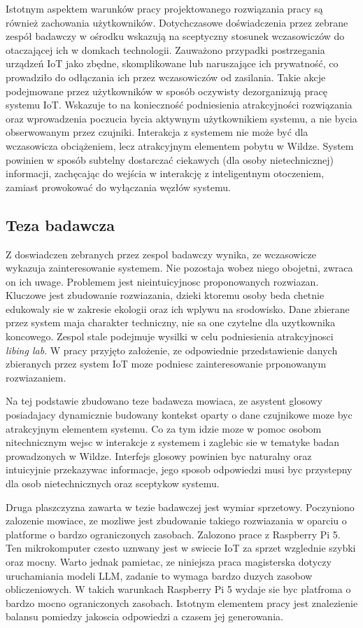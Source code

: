 Istotnym aspektem warunków pracy projektowanego rozwiązania pracy są również zachowania użytkowników. Dotychczasowe doświadczenia przez zebrane zespół badawczy w ośrodku wskazują na sceptyczny stosunek wczasowiczów do otaczającej ich w domkach technologii. Zauważono przypadki postrzegania urządzeń IoT jako zbędne, skomplikowane lub naruszające ich prywatność, co prowadziło do odłączania ich przez wczasowiczów od zasilania. Takie akcje podejmowane przez użytkowników w sposób oczywisty dezorganizują pracę systemu IoT. Wskazuje to na konieczność podniesienia atrakcyjności rozwiązania oraz wprowadzenia poczucia bycia aktywnym użytkownikiem systemu, a nie bycia obserwowanym przez czujniki. Interakcja z systemem nie może być dla wczasowicza obciążeniem, lecz atrakcyjnym elementem pobytu w Wildze. System powinien w sposób subtelny dostarczać ciekawych (dla osoby nietechnicznej) informacji, zachęcając do wejścia w interakcję z inteligentnym otoczeniem, zamiast prowokować do wyłączania węzłów systemu.

\subsection{Teza badawcza}

Z doswiadczen zebranych przez zespol badawczy wynika, ze wczasowicze wykazuja zainteresowanie systemem. Nie pozostaja wobez niego obojetni, zwraca on ich uwage. Problemem jest nieintuicyjnosc proponowanych rozwiazan. Kluczowe jest zbudowanie rozwiazania, dzieki ktoremu osoby beda chetnie edukowaly sie w zakresie ekologii oraz ich wplywu na srodowisko. Dane zbierane przez system maja charakter techniczny, nie sa one czytelne dla uzytkownika koncowego. Zespol stale podejmuje wysilki w celu podniesienia atrakcyjnosci \textit{libing lab}. W pracy przyjęto założenie, ze odpowiednie przedstawienie danych zbieranych przez system IoT moze podniesc zainteresowanie prponowanym rozwiazaniem.


Na tej podstawie zbudowano teze badawcza mowiaca, ze asystent glosowy posiadajacy dynamicznie budowany kontekst oparty o dane czujnikowe moze byc atrakcyjnym elementem systemu. Co za tym idzie moze w pomoc osobom nitechnicznym wejsc w interakcje z systemem i zaglebic sie w tematyke badan prowadzonych w Wildze. Interfejs glosowy powinien byc naturalny oraz intuicyjnie przekazywac informacje, jego sposob odpowiedzi musi byc przystepny dla osob nietechnicznych oraz sceptykow systemu.

Druga plaszczyzna zawarta w tezie badawczej jest wymiar sprzetowy. Poczyniono zalozenie mowiace, ze mozliwe jest zbudowanie takiego rozwiazania w oparciu o platforme o bardzo ograniczonych zasobach. Zalozono prace z Raspberry Pi 5. Ten mikrokomputer czesto uznwany jest w swiecie IoT za sprzet wzglednie szybki oraz mocny. Warto jednak pamietac, ze niniejsza praca magisterska dotyczy uruchamiania modeli LLM, zadanie to wymaga bardzo duzych zasobow obliczeniowych. W takich warunkach Raspberry Pi 5 wydaje sie byc platfroma o bardzo mocno ograniczonych zasobach. Istotnym elementem pracy jest znalezienie balansu pomiedzy jakoscia odpowiedzi a czasem jej generowania.


